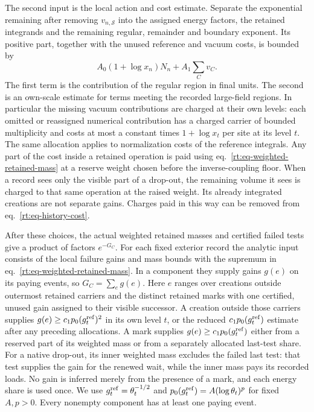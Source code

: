 \documentclass[11pt,letterpaper,reqno]{amsart}
\numberwithin{equation}{section}
\renewcommand{\eqref}[1]{\textup{eq.~\ref{#1}}}
\theoremstyle{definition}
\theoremstyle{remark}
\begin{document}
The second input is the local action and cost estimate. Separate
the exponential remaining after removing \(v_{n,\mathcal S}\)
into the assigned energy factors, the retained integrands and
the remaining regular, remainder and boundary exponent. Its
positive part, together with the unused reference and vacuum
costs, is bounded by
\begin{equation}\label{rt:eq-history-cost}
      A_0(1+\log x_n)N_n + A_1\sum_C v_C.
\end{equation}
The first term is the contribution of the regular region in
final units. The second is an own-scale estimate for terms
meeting the recorded large-field regions. In particular the
missing vacuum contributions are charged at their own levels:
each omitted or reassigned numerical contribution has a charged
carrier of bounded multiplicity and costs at most a constant
times \(1+\log x_t\) per site at its level \(t\).
The same allocation applies to normalization costs of the
reference integrals. Any part of the cost inside a retained
operation is paid using \eqref{rt:eq-weighted-retained-mass}
at a reserve weight chosen before the inverse-coupling floor.
When a record sees only the visible part of a drop-out, the
remaining volume it sees is charged to that same operation
at the raised weight. Its already integrated creations are
not separate gains. Charges paid in this way can be removed
from \eqref{rt:eq-history-cost}.

After these choices, the actual weighted retained masses and
certified failed tests give a product of factors \(e^{-G_C}\).
For each fixed exterior record the analytic input consists of
the local failure gains and mass bounds with the supremum
in \eqref{rt:eq-weighted-retained-mass}. In a component
they supply gains \(g(e)\) on its paying events, so
\(G_C=\sum_e g(e)\). Here \(e\) ranges over creations outside
outermost retained carriers and the distinct retained marks
with one certified, unused gain assigned to their visible successor. A creation outside
those carriers supplies \(g(e)\ge c_1 p_0(g_t^{\rm ref})^2\) in its
own level \(t\), or the reduced \(c_1p_0(g_t^{\rm ref})\) estimate
after any preceding allocations. A mark supplies \(g(e)\ge c_1p_0(g_t^{\rm ref})\) either from a
reserved part of its weighted mass or from a separately allocated
last-test share. For a native drop-out, its inner weighted mass
excludes the failed last test: that test supplies the gain for
the renewed wait, while the inner mass pays its recorded loads.
No gain is inferred merely from the presence of a mark, and each
energy share is used once.
We use \(g_t^{\rm ref}=\theta_t^{-1/2}\) and
\(p_0(g_t^{\rm ref})=A(\log\theta_t)^p\) for fixed \(A,p>0\).
Every nonempty component has at least one paying event.
\end{document}
